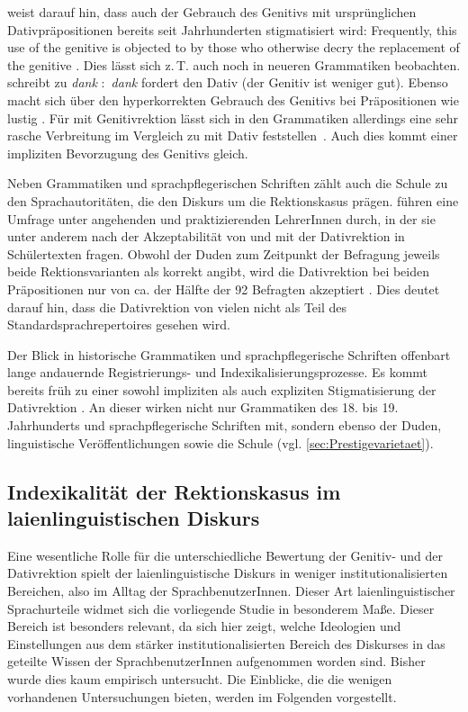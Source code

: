 \citeauthor[]{Scott.2014} weist darauf hin, dass auch der Gebrauch des Genitivs mit urspr{\"u}nglichen Dativpr{\"a}positionen bereits seit Jahrhunderten stigmatisiert wird: \glqq Frequently, this use of the genitive is objected to by those who otherwise decry the replacement of the genitive\grqq{} \citep[303]{Scott.2014}.
Dies lässt sich z.\,T. auch noch in neueren Grammatiken beobachten. 
\citet[374]{Jung1980} schreibt zu \textit{dank }:\textit{~}{\glqq}\textit{dank }fordert den Dativ (der Genitiv ist weniger gut){\grqq}.
Ebenso macht \citeauthor{Sick2006} sich über den \glqq hyperkorrekten\grqq{} Gebrauch des Genitivs bei Präpositionen wie  lustig \citep[s.][210]{Davies2006}. 
F{\"u}r \dank{} mit Genitivrektion l{\"a}sst sich in den Grammatiken allerdings eine sehr rasche Verbreitung im Vergleich zu \wegen{} mit Dativ feststellen~\citep[s.][257]{Baumann2014}. 
Auch dies kommt einer impliziten Bevorzugung des Genitivs gleich. 

Neben Grammatiken und sprachpflegerischen Schriften zählt auch die Schule zu den Sprachautoritäten, die den Diskurs um die Rektionskasus prägen. 
\citet{Baumann2014} führen eine Umfrage unter angehenden und praktizierenden LehrerInnen durch, in der sie unter anderem nach der Akzeptabilität von \wegen{} und \dank{} mit der Dativrektion in Schülertexten fragen. 
Obwohl der Duden zum Zeitpunkt der Befragung jeweils beide Rektionsvarianten als korrekt angibt, wird die Dativrektion bei beiden Präpositionen nur von ca. der Hälfte der 92 Befragten akzeptiert \citep[s.][264--265]{Baumann2014}. 
Dies deutet darauf hin, dass die Dativrektion von vielen nicht als Teil des Standardsprachrepertoires gesehen wird. 

Der Blick in historische Grammatiken und sprachpflegerische Schriften offenbart lange andauernde Registrierungs- und Indexikalisierungsprozesse. 
Es kommt bereits früh zu einer sowohl impliziten als auch expliziten Stigmatisierung der Dativrektion \citep[s.][]{Davies2006}. 
An dieser wirken nicht nur Grammatiken des 18. bis 19. Jahrhunderts und sprachpflegerische Schriften mit, sondern ebenso der Duden, linguistische Veröffentlichungen sowie die Schule (vgl. \autoref{sec:Prestigevarietaet}). 
\subsection{Indexikalität der Rektionskasus im laienlinguistischen Diskurs} \label{sec:IndexikalitaetRektionskasusheute}
Eine wesentliche Rolle für die unterschiedliche Bewertung der Genitiv- und der Dativrektion spielt der laienlinguistische Diskurs in weniger institutionalisierten Bereichen, also im Alltag der SprachbenutzerInnen. 
Dieser Art laienlinguistischer Sprachurteile widmet sich die vorliegende Studie in besonderem Maße. 
Dieser Bereich ist besonders relevant, da sich hier zeigt, welche Ideologien und Einstellungen aus dem stärker institutionalisierten Bereich des Diskurses in das geteilte Wissen der SprachbenutzerInnen aufgenommen worden sind. 
Bisher wurde dies kaum empirisch untersucht. 
Die Einblicke, die die wenigen vorhandenen Untersuchungen bieten, werden im Folgenden vorgestellt. 

